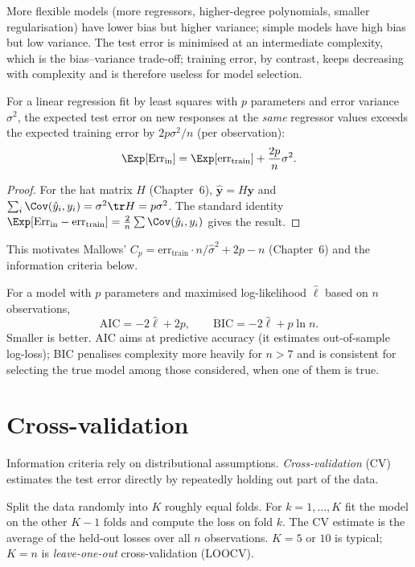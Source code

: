 More flexible models (more regressors, higher-degree polynomials, smaller regularisation) have lower bias but higher variance; simple models have high bias but low variance. The test error is minimised at an intermediate complexity, which is the bias--variance trade-off; training error, by contrast, keeps decreasing with complexity and is therefore useless for model selection.

\begin{theorem}\label{thm:optimism}
For a linear regression fit by least squares with $p$ parameters and error variance $\sigma^2$, the expected test error on new responses at the \emph{same} regressor values exceeds the expected training error by $2p\sigma^2/n$ (per observation):
\[ \Exp[\mathrm{Err}_{\mathrm{in}}]=\Exp[\mathrm{err}_{\mathrm{train}}]+\frac{2p}n\sigma^2. \]
\end{theorem}

\begin{proof}
For the hat matrix $H$ (Chapter~6), $\hat{\mathbf{y}}=H\mathbf{y}$ and $\sum_i\Cov(\hat{y}_i,y_i)=\sigma^2\tr H=p\sigma^2$. The standard identity $\Exp[\mathrm{Err}_{\mathrm{in}}-\mathrm{err}_{\mathrm{train}}]=\frac2n\sum\Cov(\hat{y}_i,y_i)$ gives the result.
\end{proof}

This motivates Mallows' $C_p=\mathrm{err}_{\mathrm{train}}\cdot n/\hat\sigma^2+2p-n$ (Chapter~6) and the information criteria below.

\begin{definition}
For a model with $p$ parameters and maximised log-likelihood $\hat\ell$ based on $n$ observations,
\[ \mathrm{AIC}=-2\hat\ell+2p,\qquad\mathrm{BIC}=-2\hat\ell+p\ln n. \]
Smaller is better. AIC aims at predictive accuracy (it estimates out-of-sample log-loss); BIC penalises complexity more heavily for $n>7$ and is consistent for selecting the true model among those considered, when one of them is true.
\end{definition}

\section{Cross-validation}

Information criteria rely on distributional assumptions. \emph{Cross-validation} (CV) estimates the test error directly by repeatedly holding out part of the data.

\begin{definition}
Split the data randomly into $K$ roughly equal folds. For $k=1,\dots,K$ fit the model on the other $K-1$ folds and compute the loss on fold $k$. The CV estimate is the average of the held-out losses over all $n$ observations. $K=5$ or $10$ is typical; $K=n$ is \emph{leave-one-out} cross-validation (LOOCV).
\end{definition}

